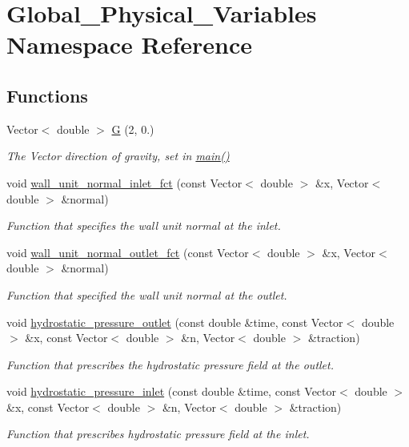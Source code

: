 \hypertarget{namespaceGlobal__Physical__Variables}{}\section{Global\+\_\+\+Physical\+\_\+\+Variables Namespace Reference}
\label{namespaceGlobal__Physical__Variables}
\subsection*{Functions}
\begin{DoxyCompactItemize}
\item 
Vector$<$ double $>$ \hyperlink{namespaceGlobal__Physical__Variables_aa868968dead376240a69f9152bd599b9}{G} (2, 0.)
\begin{DoxyCompactList}\small\item\em The Vector direction of gravity, set in \hyperlink{inclined__plane_8cc_a3c04138a5bfe5d72780bb7e82a18e627}{main()} \end{DoxyCompactList}\item 
void \hyperlink{namespaceGlobal__Physical__Variables_aa26e74c1f9f93f8212e45380f55fb562}{wall\+\_\+unit\+\_\+normal\+\_\+inlet\+\_\+fct} (const Vector$<$ double $>$ \&x, Vector$<$ double $>$ \&normal)
\begin{DoxyCompactList}\small\item\em Function that specifies the wall unit normal at the inlet. \end{DoxyCompactList}\item 
void \hyperlink{namespaceGlobal__Physical__Variables_a8ab8f6e823e4cd204ed7264121a42bfb}{wall\+\_\+unit\+\_\+normal\+\_\+outlet\+\_\+fct} (const Vector$<$ double $>$ \&x, Vector$<$ double $>$ \&normal)
\begin{DoxyCompactList}\small\item\em Function that specified the wall unit normal at the outlet. \end{DoxyCompactList}\item 
void \hyperlink{namespaceGlobal__Physical__Variables_ab577639e7c51979d3db7565c08c69c70}{hydrostatic\+\_\+pressure\+\_\+outlet} (const double \&time, const Vector$<$ double $>$ \&x, const Vector$<$ double $>$ \&n, Vector$<$ double $>$ \&traction)
\begin{DoxyCompactList}\small\item\em Function that prescribes the hydrostatic pressure field at the outlet. \end{DoxyCompactList}\item 
void \hyperlink{namespaceGlobal__Physical__Variables_af1f48eb04a3c7f97b1efacea533acdbc}{hydrostatic\+\_\+pressure\+\_\+inlet} (const double \&time, const Vector$<$ double $>$ \&x, const Vector$<$ double $>$ \&n, Vector$<$ double $>$ \&traction)
\begin{DoxyCompactList}\small\item\em Function that prescribes hydrostatic pressure field at the inlet. \end{DoxyCompactList}\end{DoxyCompactItemize}
